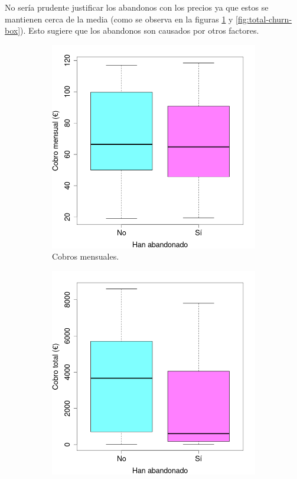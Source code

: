 \documentclass[10pt,a4paper]{article}
\begin{document}
No sería prudente justificar los abandonos con los precios ya que estos se mantienen cerca de la media (como se observa en la figuras \ref{fig:month-churn-box} y \ref{fig:total-churn-box}). Esto sugiere que los abandonos son causados por otros factores.
\begin{figure}[!htb]
     \centering
     \begin{subfigure}[b]{0.4\textwidth}
         \centering
         \includegraphics[width=\textwidth]{month-churn-box}
         \caption{Cobros mensuales.}
		 \label{fig:month-churn-box}
	 \end{subfigure}\hspace{1cm}
     \begin{subfigure}[b]{0.4\textwidth}
         \centering
         \includegraphics[width=\textwidth]{total-churn-box}

\end{subfigure}
\end{figure}
\end{document}
